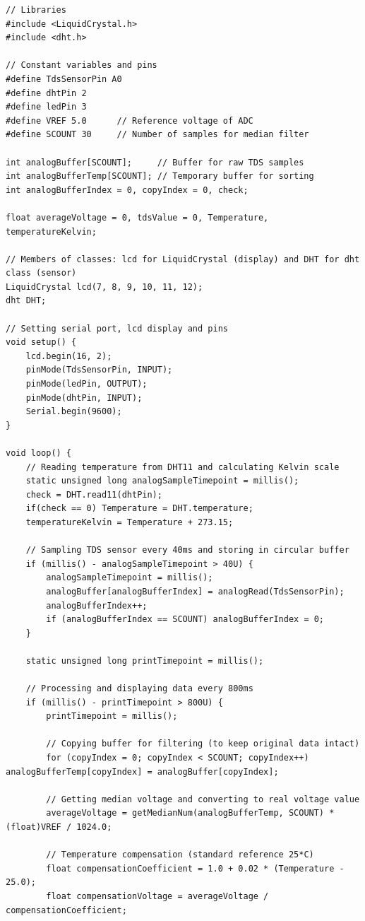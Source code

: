 \documentclass[12pt, a4paper]{article}
\begin{document}
	\begin{verbatim}
// Libraries
#include <LiquidCrystal.h>
#include <dht.h>

// Constant variables and pins
#define TdsSensorPin A0
#define dhtPin 2
#define ledPin 3
#define VREF 5.0      // Reference voltage of ADC
#define SCOUNT 30     // Number of samples for median filter

int analogBuffer[SCOUNT];     // Buffer for raw TDS samples
int analogBufferTemp[SCOUNT]; // Temporary buffer for sorting
int analogBufferIndex = 0, copyIndex = 0, check;

float averageVoltage = 0, tdsValue = 0, Temperature, temperatureKelvin;

// Members of classes: lcd for LiquidCrystal (display) and DHT for dht class (sensor)
LiquidCrystal lcd(7, 8, 9, 10, 11, 12);
dht DHT;

// Setting serial port, lcd display and pins
void setup() { 
	lcd.begin(16, 2);
	pinMode(TdsSensorPin, INPUT);
	pinMode(ledPin, OUTPUT);
	pinMode(dhtPin, INPUT);
	Serial.begin(9600);
} 

void loop() { 
	// Reading temperature from DHT11 and calculating Kelvin scale
	static unsigned long analogSampleTimepoint = millis();
	check = DHT.read11(dhtPin);
	if(check == 0) Temperature = DHT.temperature;
	temperatureKelvin = Temperature + 273.15;
	
	// Sampling TDS sensor every 40ms and storing in circular buffer
	if (millis() - analogSampleTimepoint > 40U) {
		analogSampleTimepoint = millis();
		analogBuffer[analogBufferIndex] = analogRead(TdsSensorPin);
		analogBufferIndex++;
		if (analogBufferIndex == SCOUNT) analogBufferIndex = 0;
	}
	
	static unsigned long printTimepoint = millis();
	
	// Processing and displaying data every 800ms
	if (millis() - printTimepoint > 800U) {
		printTimepoint = millis();
		
		// Copying buffer for filtering (to keep original data intact)
		for (copyIndex = 0; copyIndex < SCOUNT; copyIndex++) analogBufferTemp[copyIndex] = analogBuffer[copyIndex];
		
		// Getting median voltage and converting to real voltage value
		averageVoltage = getMedianNum(analogBufferTemp, SCOUNT) * (float)VREF / 1024.0;
		
		// Temperature compensation (standard reference 25*C)
		float compensationCoefficient = 1.0 + 0.02 * (Temperature - 25.0);
		float compensationVoltage = averageVoltage / compensationCoefficient;
		

\end{verbatim}
\end{document}
